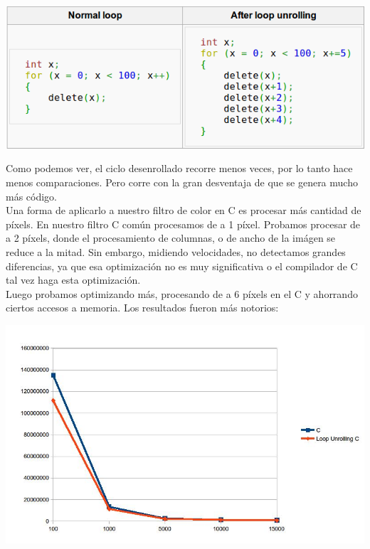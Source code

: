 \begin{center}
\includegraphics[scale=0.5]{imagenes/loopunrolling_ejemplo.png}
\end{center}

Como podemos ver, el ciclo desenrollado recorre menos veces, por lo tanto hace menos comparaciones. Pero corre con la gran desventaja de que se genera mucho m\'as c\'odigo.\\
Una forma de aplicarlo a nuestro filtro de color en C es procesar m\'as cantidad de p\'ixels. En nuestro filtro C com\'un procesamos de a 1 p\'ixel. Probamos procesar de a 2 p\'ixels, donde el procesamiento de columnas, o de ancho de la im\'agen se reduce a la mitad. Sin embargo, midiendo velocidades, no detectamos grandes diferencias, ya que esa optimizaci\'on no es muy significativa o el compilador de C tal vez haga esta optimizaci\'on.\\
Luego probamos optimizando m\'as, procesando de a 6 p\'ixels en el C y ahorrando ciertos accesos a memoria. Los resultados fueron m\'as notorios:

\begin{center}
\includegraphics[scale=0.5]{imagenes/loopunrolling_c.jpg}
\end{center}


